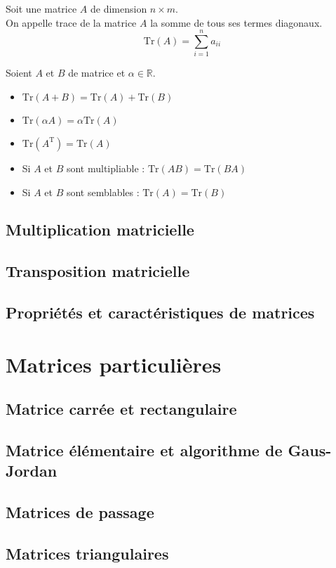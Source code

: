 \begin{defi}
Soit une matrice $A$ de dimension $n\times m$.\\
On appelle trace de la matrice $A$ la somme de tous ses termes diagonaux.
$$\text{Tr}(A)=\sum_{i=1}^n a_{ii}$$
\end{defi}
\begin{prop}
Soient $A$ et $B$ de matrice et $\alpha\in\mathbb{R}$.\\
\begin{itemize}
    \item $\text{Tr}(A+B)=\text{Tr}(A)+\text{Tr}(B)$
    \item $\text{Tr}(\alpha A)=\alpha\text{Tr}(A)$
    \item $\text{Tr}(A^\text{T})=\text{Tr}(A)$
    \item Si $A$ et $B$ sont multipliable : $\text{Tr}(AB)=\text{Tr}(BA)$
    \item Si $A$ et $B$ sont semblables : $\text{Tr}(A)=\text{Tr}(B)$
\end{itemize}
\end{prop}
\subsection{Multiplication matricielle}
\subsection{Transposition matricielle}
\subsection{Propriétés et caractéristiques de matrices}
\section{Matrices particulières}
\subsection{Matrice carrée et rectangulaire}
\subsection{Matrice élémentaire et algorithme de Gaus-Jordan}
\subsection{Matrices de passage}
\subsection{Matrices triangulaires}
